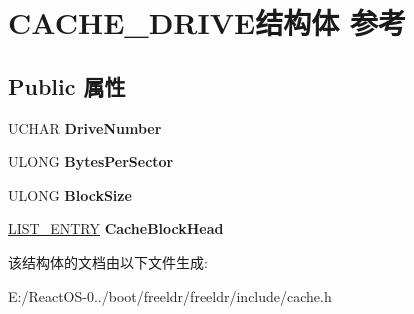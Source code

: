 \hypertarget{struct_c_a_c_h_e___d_r_i_v_e}{}\section{C\+A\+C\+H\+E\+\_\+\+D\+R\+I\+V\+E结构体 参考}
\label{struct_c_a_c_h_e___d_r_i_v_e}
\subsection*{Public 属性}
\begin{DoxyCompactItemize}
\item 
\mbox{\label{struct_c_a_c_h_e___d_r_i_v_e_aff742ad2cfb577c3f356ab11d6b9d3a5}} 
U\+C\+H\+AR {\bfseries Drive\+Number}
\item 
\mbox{\label{struct_c_a_c_h_e___d_r_i_v_e_a1c391a26d0f50a49b9174b7bbc394a08}} 
U\+L\+O\+NG {\bfseries Bytes\+Per\+Sector}
\item 
\mbox{\label{struct_c_a_c_h_e___d_r_i_v_e_a8be653e426f907c1a98e880efbf3f8a0}} 
U\+L\+O\+NG {\bfseries Block\+Size}
\item 
\mbox{\label{struct_c_a_c_h_e___d_r_i_v_e_a22f8cf7e0f01056de0fbb5cfb675f5f9}} 
\hyperlink{struct___l_i_s_t___e_n_t_r_y}{L\+I\+S\+T\+\_\+\+E\+N\+T\+RY} {\bfseries Cache\+Block\+Head}
\end{DoxyCompactItemize}


该结构体的文档由以下文件生成\+:\begin{DoxyCompactItemize}
\item 
E\+:/\+React\+O\+S-\/0../boot/freeldr/freeldr/include/cache.\+h\end{DoxyCompactItemize}
